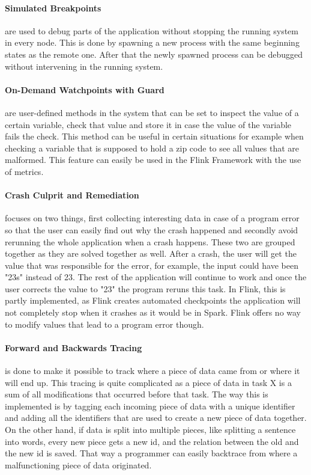 \paragraph{Simulated Breakpoints} are used to debug parts of the application without stopping the running system in every node. This is done by spawning a new process with the same beginning states as the remote one. After that the newly spawned process can be debugged without intervening in the running system.

\paragraph{On-Demand Watchpoints with Guard} are user-defined methods in the system that can be set to inspect the value of a certain variable, check that value and store it in case the value of the variable fails the check. This method can be useful in certain situations for example when checking a variable that is supposed to hold a zip code to see all values that are malformed. This feature can easily be used in the Flink Framework with the use of metrics.

\paragraph{Crash Culprit and Remediation} focuses on two things, first collecting interesting data in case of a program error so that the user can easily find out why the crash happened and secondly avoid rerunning the whole application when a crash happens. These two are grouped together as they are solved together as well. After a crash, the user will get the value that was responsible for the error, for example, the input could have been "23s" instead of 23. The rest of the application will continue to work and once the user corrects the value to "23" the program reruns this task. In Flink, this is partly implemented, as Flink creates automated checkpoints the application will not completely stop when it crashes as it would be in Spark. Flink offers no way to modify values that lead to a program error though.

\paragraph{Forward and Backwards Tracing} is done to make it possible to track where a piece of data came from or where it will end up. This tracing is quite complicated as a piece of data in task X is a sum of all modifications that occurred before that task. The way this is implemented is by tagging each incoming piece of data with a unique identifier and adding all the identifiers that are used to create a new piece of data together. On the other hand, if data is split into multiple pieces, like splitting a sentence into words, every new piece gets a new id, and the relation between the old and the new id is saved. That way a programmer can easily backtrace from where a malfunctioning piece of data originated.

